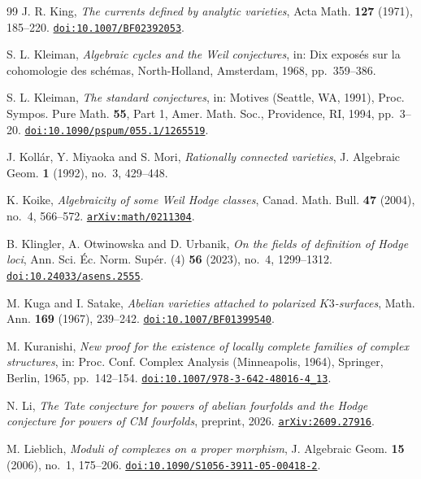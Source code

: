 \begin{thebibliography}{99}
J. R. King,
\emph{The currents defined by analytic varieties},
Acta Math. \textbf{127} (1971), 185--220.
\href{https://doi.org/10.1007/BF02392053}{\texttt{doi:10.1007/BF02392053}}.

S. L. Kleiman,
\emph{Algebraic cycles and the Weil conjectures},
in: Dix expos\'es sur la cohomologie des sch\'emas,
North-Holland, Amsterdam, 1968, pp.~359--386.

S. L. Kleiman,
\emph{The standard conjectures},
in: Motives (Seattle, WA, 1991),
Proc. Sympos. Pure Math. \textbf{55}, Part 1,
Amer. Math. Soc., Providence, RI, 1994, pp.~3--20.
\href{https://doi.org/10.1090/pspum/055.1/1265519}{\texttt{doi:10.1090/pspum/055.1/1265519}}.

J. Koll\'ar, Y. Miyaoka and S. Mori,
\emph{Rationally connected varieties},
J. Algebraic Geom. \textbf{1} (1992), no.~3, 429--448.

K. Koike,
\emph{Algebraicity of some Weil Hodge classes},
Canad. Math. Bull. \textbf{47} (2004), no.~4, 566--572.
\href{https://arxiv.org/abs/math/0211304}{\texttt{arXiv:math/0211304}}.

B. Klingler, A. Otwinowska and D. Urbanik,
\emph{On the fields of definition of Hodge loci},
Ann. Sci. \'Ec. Norm. Sup\'er. (4) \textbf{56} (2023), no.~4, 1299--1312.
\href{https://doi.org/10.24033/asens.2555}{\texttt{doi:10.24033/asens.2555}}.

M. Kuga and I. Satake,
\emph{Abelian varieties attached to polarized $K3$-surfaces},
Math. Ann. \textbf{169} (1967), 239--242.
\href{https://doi.org/10.1007/BF01399540}{\texttt{doi:10.1007/BF01399540}}.

M. Kuranishi,
\emph{New proof for the existence of locally complete families of complex
structures},
in: Proc. Conf. Complex Analysis (Minneapolis, 1964),
Springer, Berlin, 1965, pp.~142--154.
\href{https://doi.org/10.1007/978-3-642-48016-4_13}{\texttt{doi:10.1007/978-3-642-48016-4\_13}}.

N. Li,
\emph{The Tate conjecture for powers of abelian fourfolds and the Hodge
conjecture for powers of CM fourfolds},
preprint, 2026.
\href{https://arxiv.org/abs/2609.27916}{\texttt{arXiv:2609.27916}}.

M. Lieblich,
\emph{Moduli of complexes on a proper morphism},
J. Algebraic Geom. \textbf{15} (2006), no.~1, 175--206.
\href{https://doi.org/10.1090/S1056-3911-05-00418-2}%
{\texttt{doi:10.1090/S1056-3911-05-00418-2}}.


\end{thebibliography}
